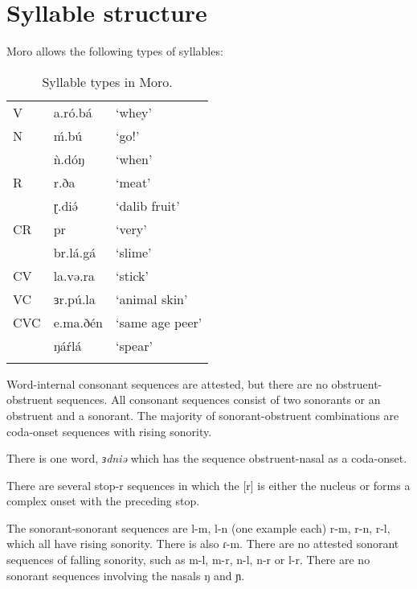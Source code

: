 \chapter{Syllable structure}

Moro allows the following types of syllables:

\begin{table}
  \begin{tabular}{lll}
    \lsptoprule
V	&	a.ró.bá	&	‘whey’	\\
N	&	ḿ.bú	&	‘go!’\\
	&	ǹ.dóŋ	&		‘when’\\
R	&	r.ða	&	‘meat’\\
	&	ɽ.diə́	&	‘dalib fruit’\\
CR	&	pr		&	‘very’\\
	&	br.lá.gá&		‘slime’\\
CV	&	la.və.ra&		‘stick’\\
VC	&	ɜr.pú.la&	‘animal skin’\\
CVC	&	e.ma.ðén&	‘same age peer’\\
	&	ŋáŕlá	&	‘spear’\\
\lspbottomrule
  \end{tabular}
  \caption{Syllable types in Moro.}
  \label{tab:ch3:1}
\end{table}


Word-internal consonant sequences are attested, but there are no obstruent-obstruent sequences. All consonant sequences consist of two sonorants or an obstruent and a sonorant. The majority of sonorant-obstruent combinations are coda-onset sequences with rising sonority. 

There is one word, \textit{ɜdniə} which has the sequence obstruent-nasal as a coda-onset. 


There are several stop-r sequences in which the [r] is either the nucleus or forms a complex onset with the preceding stop. 


The sonorant-sonorant sequences are l-m, l-n (one example each) r-m, r-n, r-l, which all have rising sonority. There is also ɾ-m. There are no attested sonorant sequences of falling sonority, such as m-l, m-r, n-l, n-r or l-r. There are no sonorant sequences involving the nasals ŋ and ɲ. 

